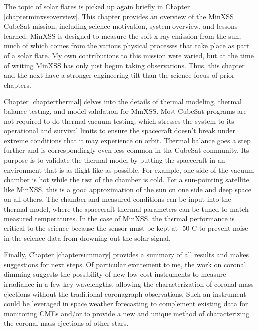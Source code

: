 The topic of solar flares is picked up again briefly in Chapter \ref{chapterminxssoverview}. This chapter provides an overview of the MinXSS CubeSat mission, including science motivation, system overview, and lessons learned. MinXSS is designed to measure the soft x-ray emission from the sun, much of which comes from the various physical processes that take place as part of a solar flare. My own contributions to this mission were varied, but at the time of writing MinXSS has only just begun taking observations. Thus, this chapter and the next have a stronger engineering tilt than the science focus of prior chapters. 

Chapter \ref{chapterthermal} delves into the details of thermal modeling, thermal balance testing, and model validation for MinXSS. Most CubeSat programs are not required to do thermal vacuum testing, which stresses the system to its operational and survival limits to ensure the spacecraft doesn't break under extreme conditions that it may experience on orbit. Thermal balance goes a step further and is correspondingly even less common in the CubeSat community. Its purpose is to validate the thermal model by putting the spacecraft in an environment that is as flight-like as possible. For example, one side of the vacuum chamber is hot while the rest of the chamber is cold. For a sun-pointing satellite like MinXSS, this is a good approximation of the sun on one side and deep space on all others. The chamber and measured conditions can be input into the thermal model, where the spacecraft thermal parameters can be tuned to match measured temperatures. In the case of MinXSS, the thermal performance is critical to the science because the sensor must be kept at -50 \degree C to prevent noise in the science data from drowning out the solar signal. 

Finally, Chapter \ref{chaptersummary} provides a summary of all results and makes suggestions for next steps. Of particular excitement to me, the work on coronal dimming suggests the possibility of new low-cost instruments to measure irradiance in a few key wavelengths, allowing the characterization of coronal mass ejections without the traditional coronagraph observations. Such an instrument could be leveraged in space weather forecasting to complement existing data for monitoring CMEs and/or to provide a new and unique method of characterizing the coronal mass ejections of other stars. 
